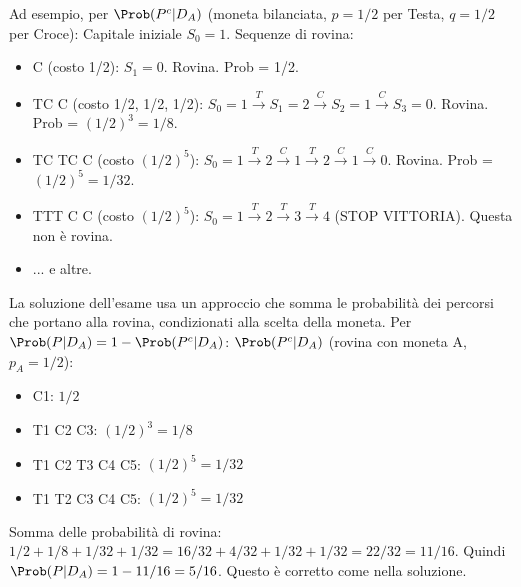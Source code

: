 \begin{example}
Ad esempio, per $\Prob(P^c|D_A)$ (moneta bilanciata, $p=1/2$ per Testa, $q=1/2$ per Croce):
Capitale iniziale $S_0=1$.
Sequenze di rovina:
\begin{itemize}
    \item C (costo 1/2): $S_1=0$. Rovina. Prob = 1/2.
    \item TC C (costo 1/2, 1/2, 1/2): $S_0=1 \xrightarrow{T} S_1=2 \xrightarrow{C} S_2=1 \xrightarrow{C} S_3=0$. Rovina. Prob = $(1/2)^3 = 1/8$.
    \item TC TC C (costo $(1/2)^5$): $S_0=1 \xrightarrow{T} 2 \xrightarrow{C} 1 \xrightarrow{T} 2 \xrightarrow{C} 1 \xrightarrow{C} 0$. Rovina. Prob = $(1/2)^5 = 1/32$.
    \item TTT C C (costo $(1/2)^5$): $S_0=1 \xrightarrow{T} 2 \xrightarrow{T} 3 \xrightarrow{T} 4$ (STOP VITTORIA). Questa non è rovina.
    \item ... e altre.
\end{itemize}
La soluzione dell'esame usa un approccio che somma le probabilità dei percorsi che portano alla rovina, condizionati alla scelta della moneta.
Per $\Prob(P|D_A) = 1 - \Prob(P^c|D_A)$:
$\Prob(P^c|D_A)$ (rovina con moneta A, $p_A=1/2$):
\begin{itemize}
    \item C1: $1/2$
    \item T1 C2 C3: $(1/2)^3 = 1/8$
    \item T1 C2 T3 C4 C5: $(1/2)^5 = 1/32$
    \item T1 T2 C3 C4 C5: $(1/2)^5 = 1/32$
\end{itemize}
Somma delle probabilità di rovina: $1/2 + 1/8 + 1/32 + 1/32 = 16/32 + 4/32 + 1/32 + 1/32 = 22/32 = 11/16$.
Quindi $\Prob(P|D_A) = 1 - 11/16 = 5/16$. Questo è corretto come nella soluzione.


\end{example}
